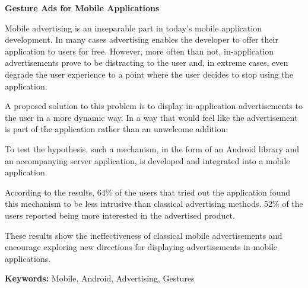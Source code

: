 \begin{abstracts}

\textbf{Gesture Ads for Mobile Applications}

Mobile advertising is an inseparable part in today's mobile application development. In many cases advertising enables the developer to offer their application to users for free. However, more often than not, in-application advertisements prove to be distracting to the user and, in extreme cases, even degrade the user experience to a point where the user decides to stop using the application.

A proposed solution to this problem is to display in-application advertisements to the user in a more dynamic way. In a way that would feel like the advertisement is part of the application rather than an unwelcome addition.

To test the hypothesis, such a mechanism, in the form of an Android library and an accompanying server application, is developed and integrated into a mobile application.

According to the results, 64\% of the users that tried out the application found this mechanism to be less intrusive than classical advertising methods. 52\% of the users reported being more interested in the advertised product.

These results show the ineffectiveness of classical mobile advertisements and encourage exploring new directions for displaying advertisements in mobile applications.

\bigskip

\textbf{Keywords:} Mobile, Android, Advertising, Gestures

\end{abstracts}